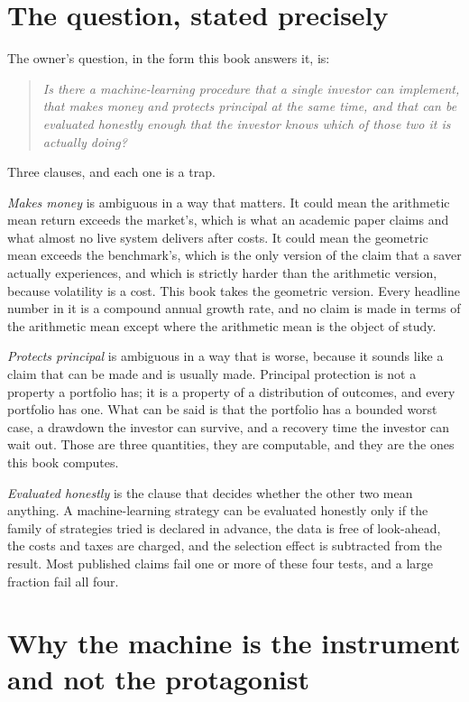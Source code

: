 \section{The question, stated precisely}

The owner's question, in the form this book answers it, is:

\begin{quote}
\textit{Is there a machine-learning procedure that a single investor can
implement, that makes money and protects principal at the same time, and
that can be evaluated honestly enough that the investor knows which of those
two it is actually doing?}
\end{quote}

Three clauses, and each one is a trap.

\emph{Makes money} is ambiguous in a way that matters. It could mean the
arithmetic mean return exceeds the market's, which is what an academic
paper claims and what almost no live system delivers after costs. It could
mean the geometric mean exceeds the benchmark's, which is the only version
of the claim that a saver actually experiences, and which is strictly harder
than the arithmetic version, because volatility is a cost. This book takes
the geometric version. Every headline number in it is a compound annual
growth rate, and no claim is made in terms of the arithmetic mean except
where the arithmetic mean is the object of study.

\emph{Protects principal} is ambiguous in a way that is worse, because it
sounds like a claim that can be made and is usually made. Principal
protection is not a property a portfolio has; it is a property of a
distribution of outcomes, and every portfolio has one. What can be said
is that the portfolio has a bounded worst case, a drawdown the investor
can survive, and a recovery time the investor can wait out. Those are three
quantities, they are computable, and they are the ones this book computes.

\emph{Evaluated honestly} is the clause that decides whether the other two
mean anything. A machine-learning strategy can be evaluated honestly only
if the family of strategies tried is declared in advance, the data is free
of look-ahead, the costs and taxes are charged, and the selection effect is
subtracted from the result. Most published claims fail one or more of these
four tests, and a large fraction fail all four.

\section{Why the machine is the instrument and not the protagonist}

